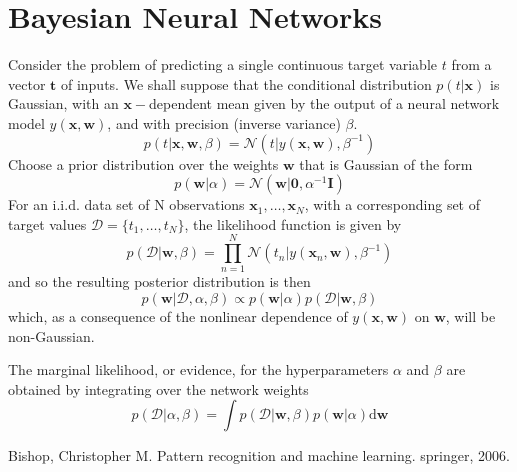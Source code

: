 \documentclass[5p,sort&compress]{elsarticle}
\begin{document}
\section{Bayesian Neural Networks}

Consider the problem of predicting a single continuous target variable $t$ from a vector $\mathbf{t}$ of inputs. We shall suppose that the conditional distribution $p(t|\mathbf{x})$ is Gaussian, with an $\mathbf{x}-$dependent mean given by the output of a neural network model $y(\mathbf{x}, \mathbf{w})$, and with precision (inverse variance) $\beta$.
\begin{equation}
p(t | \mathbf{x}, \mathbf{w}, \beta)=\mathcal{N}\left(t | y(\mathbf{x}, \mathbf{w}), \beta^{-1}\right)
\end{equation}
Choose a prior distribution over the weights $\mathbf{w}$ that is Gaussian of the form
\begin{equation}
p(\mathbf{w} | \alpha)=\mathcal{N}\left(\mathbf{w} | \mathbf{0}, \alpha^{-1} \mathbf{I}\right)
\end{equation}
For an i.i.d. data set of N observations $\mathbf{x}_1, \ldots, \mathbf{x}_N$, with a corresponding set of target values $\mathcal{D} = \{t_1, \ldots, t_N\}$, the likelihood function is given by
\begin{equation}
p(\mathcal{D} | \mathbf{w}, \beta)=\prod_{n=1}^{N} \mathcal{N}\left(t_{n} | y\left(\mathbf{x}_{n}, \mathbf{w}\right), \beta^{-1}\right)
\end{equation}
and so the resulting posterior distribution is then
\begin{equation}
p(\mathbf{w} | \mathcal{D}, \alpha, \beta) \propto p(\mathbf{w} | \alpha) p(\mathcal{D} | \mathbf{w}, \beta)
\end{equation}
which, as a consequence of the nonlinear dependence of $y(\mathbf{x}, \mathbf{w})$ on $\mathbf{w}$, will be non-Gaussian.

The marginal likelihood, or evidence, for the hyperparameters $\alpha$ and $\beta$ are obtained by integrating over the network weights
\begin{equation}
p(\mathcal{D} | \alpha, \beta)=\int p(\mathcal{D} | \mathbf{w}, \beta) p(\mathbf{w} | \alpha) \mathrm{d} \mathbf{w}
\end{equation}
















\begin{thebibliography}{9}

Bishop, Christopher M. Pattern recognition and machine learning. springer, 2006.


\end{thebibliography}
\end{document}
